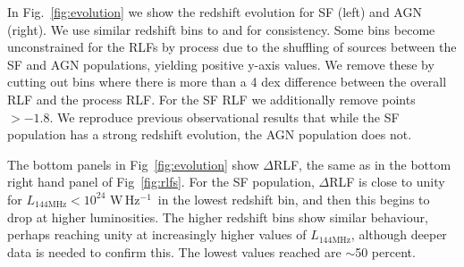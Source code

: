 \documentclass[usenatbib,fleqn,letters]{mnras}
\newcommand{\wphz}{$\,$W$\,$Hz$^{-1}$}
\newcommand{\llof}{$L_{\textrm{144MHz}}$}
\begin{document}
In Fig.~\ref{fig:evolution} we show the redshift evolution for SF (left) and AGN (right).  We use similar redshift bins to \cite{kondapally_cosmic_2022} and \cite{cochrane_lofar_2023} for consistency. Some bins become unconstrained for the RLFs by process due to the shuffling of sources between the SF and AGN populations, yielding positive y-axis values. We remove these by cutting out bins where there is more than a 4 dex difference between the overall RLF and the process RLF. For the SF RLF we additionally remove points $>-1.8$. We reproduce previous observational results that while the SF population has a strong redshift evolution, the AGN population does not. 

The bottom panels in Fig~\ref{fig:evolution} show $\Delta$RLF, the same as in the bottom right hand panel of Fig~\ref{fig:rlfs}. For the SF population, $\Delta$RLF is close to unity for $L_{\textrm{144MHz}} < 10^{24}\,$\wphz\ in the lowest redshift bin, and then this begins to drop at higher luminosities. The higher redshift bins show similar behaviour, perhaps reaching unity at increasingly higher values of $L_{\textrm{144MHz}}$, although deeper data is needed to confirm this. The lowest values reached are $\sim$50 percent. 
\end{document}
